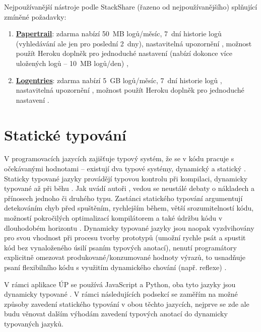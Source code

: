 Nejpoužívanější nástroje podle StackShare (řazeno od nejpoužívanějšího) \cite{stackshare-log} splňující zmíněné požadavky:
\begin{enumerate}
    \item \href{https://www.papertrail.com/}{\textbf{Papertrail}}: zdarma nabízí 50~MB logů/měsíc, 7~dní historie logů (vyhledávání ale jen pro poslední 2~dny), nastavitelná upozornění \cite{papertrail-pricing}, možnost použít Heroku doplněk pro jednoduché nastavení (nabízí dokonce více uložených logů -- 10~MB logů/den) \cite{heroku-papertrail},
    \item \href{https://logentries.com/}{\textbf{Logentries}}: zdarma nabízí 5~GB logů/měsíc, 7~dní historie logů \cite{logentries-pricing}, nastavitelná upozornění \cite{logentries-pricing2}, možnost použít Heroku doplněk pro jednoduché nastavení \cite{heroku-logentries}.
\end{enumerate}


\section{Statické typování}\label{sec:staticketypovani}

V programovacích jazycích zajišťuje typový systém, že se v kódu pracuje s očekávanými hodnotami -- existují dva typové systémy, dynamický a statický \cite{types-study}. Staticky typované jazyky provádějí typovou kontrolu při kompilaci, dynamicky typované až při běhu \cite{types-study}. Jak uvádí autoři \cite{types-study}, vedou se neustálé debaty o nákladech a přínosech jednoho či druhého typu. Zastánci statického typování argumentují detekováním chyb před spuštěním, rychlejším během, větší srozumitelností kódu, možností pokročilých optimalizací kompilátorem \cite{types-study} a také údržbu kódu v dlouhodobém horizontu \cite{types-developerhowto}. Dynamicky typované jazyky jsou naopak vyzdvihovány pro svou vhodnost při procesu tvorby prototypů (umožní rychle psát a spustit kód bez vynaloženého úsilí psaním typových anotací), nenutí programátory explicitně omezovat produkované/konzumované hodnoty výrazů, to usnadňuje psaní flexibilního kódu s využitím dynamického chování (např. reflexe) \cite{types-study}.

V rámci aplikace ÚP se používá JavaScript a Python, oba tyto jazyky jsou dynamicky typované \cite{bp}. V rámci následujících podsekcí se zaměřím na možné způsoby zavedení statického typování v obou těchto jazycích, nejprve se zde ale budu věnovat dalším výhodám zavedení typových anotací do dynamicky typovaných jazyků.

